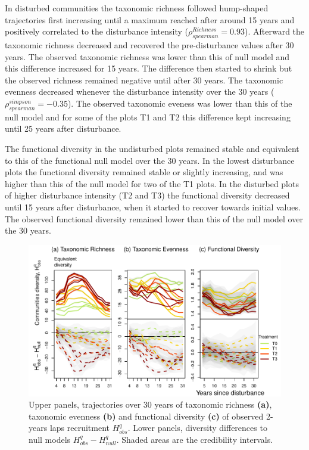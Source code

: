 \documentclass[fleqn,10pt]{ArtEcoFoG} %
\begin{document}
In disturbed communities the taxonomic richness followed hump-shaped
trajectories first increasing until a maximum reached after around 15
years and positively correlated to the disturbance intensity
(\(\rho^{Richness}_{spearman}=0.93\)). Afterward the taxonomic richness
decreased and recovered the pre-disturbance values after 30 years. The
observed taxonomic richness was lower than this of null model and this
difference increased for 15 years. The difference then started to shrink
but the observed richness remained negative until after 30 years. The
taxonomic evenness decreased whenever the disturbance intensity over the
30 years (\(\rho^{simpson}_{spearman}=-0.35\)). The observed taxonomic
eveness was lower than this of the null model and for some of the plots
T1 and T2 this difference kept increasing until 25 years after
disturbance.

The functional diversity in the undisturbed plots remained stable and
equivalent to this of the functional null model over the 30 years. In
the lowest disturbance plots the functional diversity remained stable or
slightly increasing, and was higher than this of the null model for two
of the T1 plots. In the disturbed plots of higher disturbance intensity
(T2 and T3) the functional diversity decreased until 15 years after
disturbance, when it started to recover towards initial values. The
observed functional diversity remained lower than this of the null model
over the 30 years.

\begin{figure}

{\centering \includegraphics{RecruitmentTrajectories_files/figure-latex/DivTraj-1} 

}

\caption{Upper panels, trajectories over 30 years of taxonomic richness \textbf{(a)}, taxonomic evenness \textbf{(b)} and functional diversity \textbf{(c)} of observed 2-years laps recruitment $H_{obs}^q$. Lower panels, diversity differences to null models $H_{obs}^q - H_{null}^q$. Shaded areas are the credibility intervals.}\label{fig:DivTraj}
\end{figure}
\end{document}
